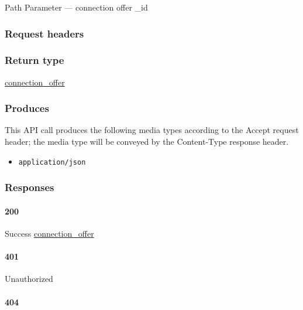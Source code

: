 {Path Parameter} --- connection offer \_id

\hypertarget{request-headers-26}{%
\subsubsection{Request headers}\label{request-headers-26}}

\hypertarget{return-type-39}{%
\subsubsection{Return type}\label{return-type-39}}

\protect\hyperlink{connection_offer}{connection\_offer}

\hypertarget{produces-49}{%
\subsubsection{Produces}\label{produces-49}}

This API call produces the following media types according to the
{Accept} request header; the media type will be conveyed by the
{Content-Type} response header.

\begin{itemize}
\tightlist
\item
  \texttt{application/json}
\end{itemize}

\hypertarget{responses-49}{%
\subsubsection{Responses}\label{responses-49}}

\hypertarget{section-161}{%
\paragraph{200}\label{section-161}}

Success \protect\hyperlink{connection_offer}{connection\_offer}

\hypertarget{section-162}{%
\paragraph{401}\label{section-162}}

Unauthorized \protect\hyperlink{}{}

\hypertarget{section-163}{%
\paragraph{404}\label{section-163}}

